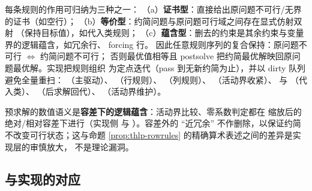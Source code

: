 \begin{remark}[约简的整体正确性原则]\label{rem:thlp-presolve-sound}
每条规则的作用可归纳为三种之一：
（a）\textbf{证书型}：直接给出原问题不可行/无界的证书（如空行）；
（b）\textbf{等价型}：约简问题与原问题可行域之间存在显式仿射双射
（保持目标值），如代入类规则；
（c）\textbf{蕴含型}：删去的约束是其余约束与变量界的逻辑蕴含，如冗余行、
forcing 行。
因此任意规则序列的复合保持：原问题不可行 $\iff$ 约简问题不可行；
否则最优值相等且 postsolve 把约简最优解映回原问题最优解。实现把规则组织
为定点迭代（pass 到无新约简为止），并以 dirty 队列避免全量重扫：
（主驱动）、
（行规则）、
（列规则）、
（活动界收紧）、
 与
（代入类）、
（后求解回代）、
（活动界维护）。
\end{remark}

\begin{boundarynote}
预求解的数值语义是\textbf{容差下的逻辑蕴含}：活动界比较、零系数判定都在
缩放后的绝对/相对容差下进行（实现侧
 与
）。容差外的
``近冗余'' 不作删除，以保证约简不改变可行状态；这与命题
\ref{prop:thlp-rowrules} 的精确算术表述之间的差异是实现层的审慎放大，
不是理论漏洞。
\end{boundarynote}

\subsection{与实现的对应}\label{subsec:thlp-mapping}


